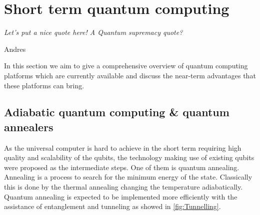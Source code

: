 \chapter{Short term quantum computing}
\label{Shortqcomp}

\epigraph{\textit{Let's put a nice quote here! A Quantum supremacy quote?}}{Andres} %

In this section we aim to give a comprehensive overview of quantum computing platforms which are currently available and discuss the near-term advantages that these platforms can bring.

\section{Adiabatic quantum computing \& quantum annealers}

As the universal computer is hard to achieve in the short term requiring high quality and scalability of the qubits, the technology making use of existing qubits were proposed as the intermediate steps. One of them is quantum annealing. Annealing is a process to search for the minimum energy of the state. Classically this is done by the thermal annealing changing the temperature adiabatically. Quantum annealing is expected to be implemented more efficiently with the assistance of entanglement and tunneling as showed in \autoref{fig:Tunnelling}.\\
 
